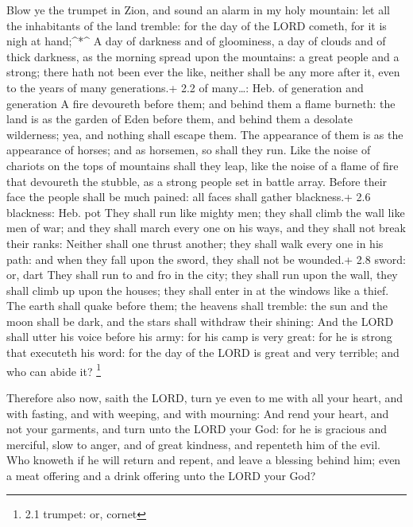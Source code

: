  Blow ye the trumpet in Zion, and sound an alarm in my holy
mountain: let all the inhabitants of the land tremble: for the day of
the LORD cometh, for it is nigh at hand;\^{}*\^{}  A day of
darkness and of gloominess, a day of clouds and of thick darkness, as
the morning spread upon the mountains: a great people and a strong;
there hath not been ever the like, neither shall be any more after it,
even to the years of many generations.+ 2.2 of many\ldots: Heb. of
generation and generation  A fire devoureth before them; and
behind them a flame burneth: the land is as the garden of Eden before
them, and behind them a desolate wilderness; yea, and nothing shall
escape them.  The appearance of them is as the appearance of
horses; and as horsemen, so shall they run.  Like the noise
of chariots on the tops of mountains shall they leap, like the noise of
a flame of fire that devoureth the stubble, as a strong people set in
battle array.  Before their face the people shall be much
pained: all faces shall gather blackness.+ 2.6 blackness: Heb. pot
 They shall run like mighty men; they shall climb the wall
like men of war; and they shall march every one on his ways, and they
shall not break their ranks:  Neither shall one thrust
another; they shall walk every one in his path: and when they fall upon
the sword, they shall not be wounded.+ 2.8 sword: or, dart 
They shall run to and fro in the city; they shall run upon the wall,
they shall climb up upon the houses; they shall enter in at the windows
like a thief.  The earth shall quake before them; the
heavens shall tremble: the sun and the moon shall be dark, and the stars
shall withdraw their shining:  And the LORD shall utter his
voice before his army: for his camp is very great: for he is strong that
executeth his word: for the day of the LORD is great and very terrible;
and who can abide it? \footnote{2.1 trumpet: or, cornet}

 Therefore also now, saith the LORD, turn ye even to me
with all your heart, and with fasting, and with weeping, and with
mourning:  And rend your heart, and not your garments, and
turn unto the LORD your God: for he is gracious and merciful, slow to
anger, and of great kindness, and repenteth him of the evil.
 Who knoweth if he will return and repent, and leave a
blessing behind him; even a meat offering and a drink offering unto the
LORD your God?


